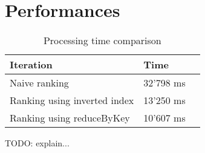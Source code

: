 \documentclass[a4paper]{article}
\begin{document}
	\pagebreak

	\section{Performances}
	
	\begin{table}[H]
		\centering

		\begin{tabular}{|l|l|l|}
			\hline
			\textbf{Iteration}           & \textbf{Time} \\ \hline
			Naive ranking                & 32'798 ms     \\ \hline
			Ranking using inverted index & 13'250 ms     \\ \hline
			Ranking using reduceByKey    & 10'607 ms     \\ \hline
		\end{tabular}
		\caption{Processing time comparison}
	\end{table}
	
	TODO: explain...
\end{document}
